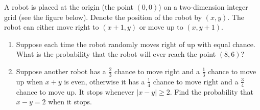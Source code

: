 
\begin{exercise}

A robot is placed at the origin (the point $(0, 0)$) on a two-dimension integer grid (see the figure below).
Denote the position of the robot by $(x, y)$.
The robot can either move right to $(x + 1, y)$ or move up to $(x, y + 1)$.

\begin{center}
\end{center}

\begin{enumerate}[label = (\alph*)]

    \item Suppose each time the robot randomly moves right of up with equal chance.
    What is the probability that the robot will ever reach the point $(8, 6)$?

    \item Suppose another robot has a $\frac{2}{3}$ chance to move right and a $\frac{1}{3}$ chance to move up when $x + y$ is even, otherwise it has a $\frac{1}{4}$ chance to move right and a $\frac{3}{4}$ chance to move up.
    It stops whenever $|x - y| \geq 2$.
    Find the probability that $x - y = 2$ when it stops.

\end{enumerate}

\end{exercise}


